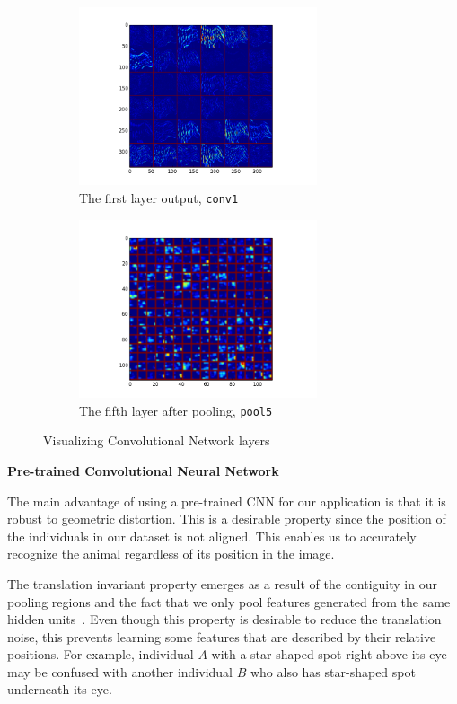\begin{figure}[htbp]
  \begin{subfigure}[t]{0.45\textwidth}
      \centering
      \includegraphics[width=7cm]{preprocess/lastconv1}
      \caption{The first layer output, \texttt{conv1}}
  \end{subfigure}
  \begin{subfigure}[t]{0.45\textwidth}
      \centering
      \includegraphics[width=7cm]{preprocess/lastpool5}
      \caption{The fifth layer after pooling, \texttt{pool5}}
  \end{subfigure}
  \captionsetup{justification=centering}
  \caption{Visualizing Convolutional Network layers}
\end{figure}


\textbf{Pre-trained Convolutional Neural Network}

The main advantage of using a pre-trained CNN for our application is that it is
robust to geometric distortion. This is a desirable property since the position
of the individuals in our dataset is not aligned. This enables us to
accurately recognize the animal regardless of its position in the image. 

The translation invariant property emerges as a result of the contiguity in our
pooling regions and the fact that we only pool features generated from the same
hidden units~\cite{ufldl}. Even though this property is desirable to reduce the
translation noise, this prevents learning some features that are described by
their relative positions. For example, individual $A$ with a star-shaped spot
right above its eye may be confused with another individual $B$ who also has
star-shaped spot underneath its eye. 

